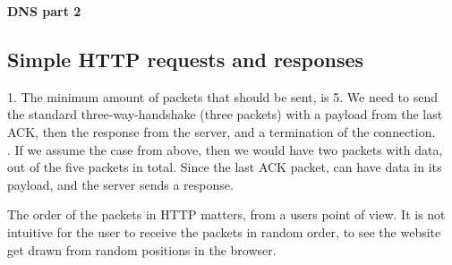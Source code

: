 \noindent \textbf{DNS part 2} \\

\subsection*{Simple HTTP requests and responses}
1. The minimum amount of packets that should be sent, is 5. We need to send the
standard three-way-handshake (three packets) with a payload from the last ACK,
then the response from the server, and a termination of the connection. \\

. If we assume the case from above, then we would have two packets
with data, out of the five packets in total. Since the last ACK packet, can have
data in its payload, and the server sends a response.

The order of the packets in HTTP matters, from a users point of view. It is not
intuitive for the user to receive the packets in random order, to see the website
get drawn from random positions in the browser.